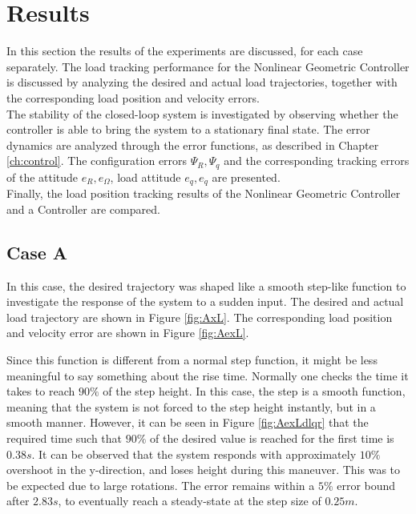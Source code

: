 \newpage
\section{Results}\label{sec:exp.results}
In this section the results of the experiments are discussed, for each case separately. 
The load tracking performance for the Nonlinear Geometric Controller is discussed by analyzing the desired and actual load trajectories,   
together with the corresponding load position and velocity errors.\\
The stability of the closed-loop system is investigated by observing whether the controller is able to bring the system to a stationary final state.
The error dynamics are analyzed through the error functions, as described in Chapter \ref{ch:control}. 
The configuration errors $ \Psi_R, \Psi_q $
and the corresponding tracking errors of the  attitude $ e_R, e_\Omega $, load attitude $ e_q, e_{\dot{q}} $ are presented.\\
Finally, the load position tracking results of the Nonlinear Geometric Controller and a  Controller are compared.

\subsection*{Case A}
In this case, the desired trajectory was shaped like a smooth step-like function to investigate the response of the system to a sudden input.
The desired and actual load trajectory are shown in Figure \ref{fig:AxL}.
The corresponding load position and velocity error are shown in Figure \ref{fig:AexL}.

Since this function is different from a normal step function, it might be less meaningful to say something about the rise time. 
Normally one checks the time it takes to reach $ 90\% $ of the step height. 
In this case, the step is a smooth function, meaning that the system is not forced to the step height instantly, but in a smooth manner. 
However, it can be seen in Figure \ref{fig:AexLdlqr} that the required time such that $ 90 \% $ of the desired value is reached for the first time is 
$ 0.38 s $.
It can be observed that the system responds with approximately $ 10 \% $ overshoot in the y-direction, and loses height during this maneuver.
This was to be expected due to large  rotations. The error remains within a $ 5 \% $ error bound after 
$ 2.83 s $, 
to eventually reach a steady-state at the step size of $ 0.25 m $. 

